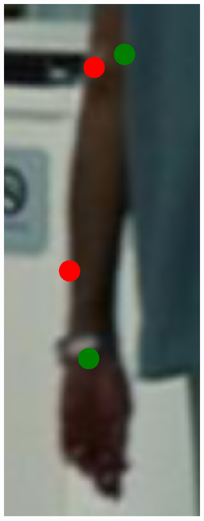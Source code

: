 \begin{figure}[!t]
    \includegraphics[height=\fh]{resources/Fixing/fix_9}
    \hfill

\end{figure}
